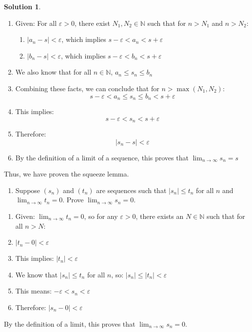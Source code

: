 \documentclass[12pt]{article}
\theoremstyle{definition} %
\newtheorem{solution}{Solution}
\theoremstyle{plain} %
\begin{document}
\begin{solution}
     \begin{enumerate}
        \item Given: For all $\varepsilon > 0$, there exist $N_1, N_2 \in \mathbb{N}$ such that for $n > N_1$ and $n > N_2$:
        \begin{enumerate}
            \item $|a_n - s| < \varepsilon$, which implies $s - \varepsilon < a_n < s + \varepsilon$
            \item $|b_n - s| < \varepsilon$, which implies $s - \varepsilon < b_n < s + \varepsilon$
        \end{enumerate}
        \item We also know that for all $n \in \mathbb{N}$, $a_n \leq s_n \leq b_n$
        \item Combining these facts, we can conclude that for $n > \max(N_1, N_2)$:
        $$
        s - \varepsilon < a_n \leq s_n \leq b_n < s + \varepsilon
        $$
        \item This implies:
        $$
        s - \varepsilon < s_n < s + \varepsilon
        $$
        \item Therefore:
        $$
        |s_n - s| < \varepsilon
        $$
        \item By the definition of a limit of a sequence, this proves that $\lim_{n \to \infty} s_n = s$
    \end{enumerate}
    Thus, we have proven the squeeze lemma. 

    \begin{enumerate}[resume]
        \item Suppose $(s_{n})$ and $(t_{n})$ are sequences such that $|s_{n}|\leq t_{n}$ for all $n$ and $\lim_{ n \to \infty }t_{n}=0$. Prove $\lim_{ n \to \infty }s_{n}=0$.
    \end{enumerate}
    \begin{enumerate}
        \item Given: $\lim_{n \to \infty} t_n = 0$, so for any $\varepsilon > 0$, there exists an $N \in \mathbb{N}$ such that for all $n > N$:
        \item $|t_n - 0| < \varepsilon$
        \item This implies: $|t_n| < \varepsilon$
        \item We know that $|s_n| \leq t_n$ for all $n$, so: $|s_n| \leq |t_n| < \varepsilon$
        \item This means: $-\varepsilon < s_n < \varepsilon$
        \item Therefore: $|s_n - 0| < \varepsilon$
    \end{enumerate}
    By the definition of a limit, this proves that $\lim_{n \to \infty} s_n = 0$. 
    
     
    \end{solution}
\end{document}
